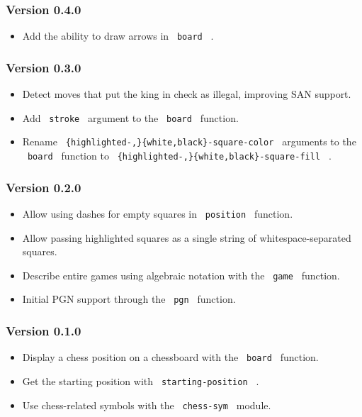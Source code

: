 \subsubsection{Version 0.4.0}\label{version-0.4.0}

\begin{itemize}
\tightlist
\item
  Add the ability to draw arrows in \texttt{\ board\ } .
\end{itemize}

\subsubsection{Version 0.3.0}\label{version-0.3.0}

\begin{itemize}
\item
  Detect moves that put the king in check as illegal, improving SAN
  support.
\item
  Add \texttt{\ stroke\ } argument to the \texttt{\ board\ } function.
\item
  Rename \texttt{\ \{highlighted-,\}\{white,black\}-square-color\ }
  arguments to the \texttt{\ board\ } function to
  \texttt{\ \{highlighted-,\}\{white,black\}-square-fill\ } .
\end{itemize}

\subsubsection{Version 0.2.0}\label{version-0.2.0}

\begin{itemize}
\item
  Allow using dashes for empty squares in \texttt{\ position\ }
  function.
\item
  Allow passing highlighted squares as a single string of
  whitespace-separated squares.
\item
  Describe entire games using algebraic notation with the
  \texttt{\ game\ } function.
\item
  Initial PGN support through the \texttt{\ pgn\ } function.
\end{itemize}

\subsubsection{Version 0.1.0}\label{version-0.1.0}

\begin{itemize}
\item
  Display a chess position on a chessboard with the \texttt{\ board\ }
  function.
\item
  Get the starting position with \texttt{\ starting-position\ } .
\item
  Use chess-related symbols with the \texttt{\ chess-sym\ } module.
\end{itemize}

